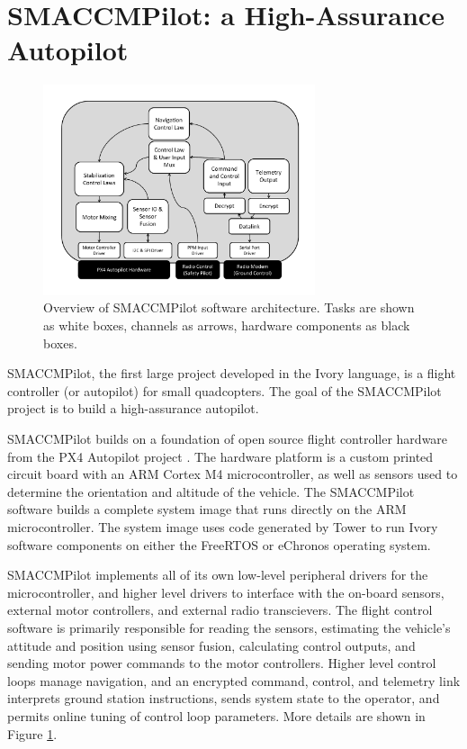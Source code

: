 \section{SMACCMPilot: a High-Assurance Autopilot}
\label{sec:smaccmpilot}

\begin{figure}
  \begin{center}
\includegraphics[width=8cm]{figures/smaccmpilot-diagram-jan14}
  \end{center}
\caption[SMACCMPilot software architecture]{Overview of SMACCMPilot
software architecture. Tasks are shown as white boxes, channels as arrows,
hardware components as black boxes.}
\label{fig:smaccmpilotSwArch}
\end{figure}


SMACCMPilot, the first large project
developed in the Ivory language, is a flight controller (or autopilot) for small
quadcopters. The goal of the SMACCMPilot project is to build a high-assurance
autopilot.

SMACCMPilot builds on a foundation of open source flight controller hardware
from the PX4 Autopilot project . The hardware platform is a
custom printed circuit board with an ARM Cortex M4 microcontroller, as well as
sensors used to determine the orientation and altitude of the vehicle.
 The
SMACCMPilot software builds a complete system image that runs directly on the
ARM microcontroller. The system image uses code generated by Tower to run Ivory
software components on either the FreeRTOS or eChronos operating system.

SMACCMPilot implements all of its own low-level peripheral drivers for the
microcontroller, and higher level drivers to interface with the on-board
sensors, external motor controllers, and external radio transcievers. The flight
control software is primarily responsible for reading the sensors, estimating
the vehicle's attitude and position using sensor fusion, calculating control
outputs, and sending motor power commands to the motor controllers.  Higher
level control loops manage navigation, and an encrypted command, control, and
telemetry link interprets ground station instructions, sends system state to the
operator, and permits online tuning of control loop parameters. More details are
shown in Figure \ref{fig:smaccmpilotSwArch}.

